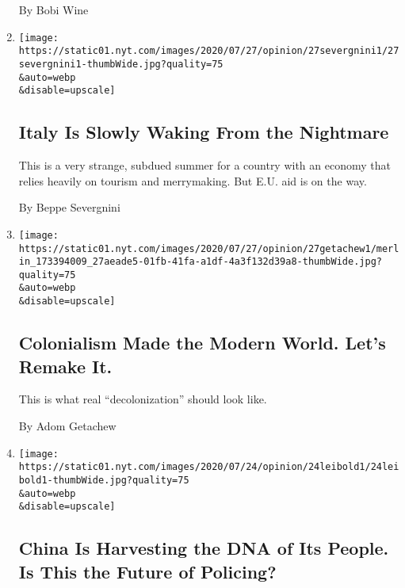 \begin{enumerate}
  By Bobi Wine
\item
  \href{/2020/07/27/opinion/italy-coronavirus.html}{}

  \texttt{[image: https://static01.nyt.com/images/2020/07/27/opinion/27severgnini1/27severgnini1-thumbWide.jpg?quality=75\\\&auto=webp\\\&disable=upscale]}

  \hypertarget{italy-is-slowly-waking-from-the-nightmare}{%
  \subsection{Italy Is Slowly Waking From the
  Nightmare}\label{italy-is-slowly-waking-from-the-nightmare}}

  This is a very strange, subdued summer for a country with an economy
  that relies heavily on tourism and merrymaking. But E.U. aid is on the
  way.

  By Beppe Severgnini
\item
  \href{/2020/07/27/opinion/sunday/decolonization-statues.html}{}

  \texttt{[image: https://static01.nyt.com/images/2020/07/27/opinion/27getachew1/merlin\_173394009\_27aeade5-01fb-41fa-a1df-4a3f132d39a8-thumbWide.jpg?quality=75\\\&auto=webp\\\&disable=upscale]}

  \hypertarget{colonialism-made-the-modern-world-lets-remake-it}{%
  \subsection{Colonialism Made the Modern World. Let's Remake
  It.}\label{colonialism-made-the-modern-world-lets-remake-it}}

  This is what real ``decolonization'' should look like.

  By Adom Getachew
\item
  \href{/2020/07/24/opinion/china-dna-police.html}{}

  \texttt{[image: https://static01.nyt.com/images/2020/07/24/opinion/24leibold1/24leibold1-thumbWide.jpg?quality=75\\\&auto=webp\\\&disable=upscale]}

  \hypertarget{china-is-harvesting-the-dna-of-its-people-is-this-the-future-of-policing}{%
  \subsection{China Is Harvesting the DNA of Its People. Is This the
  Future of
  Policing?}\label{china-is-harvesting-the-dna-of-its-people-is-this-the-future-of-policing}}


\end{enumerate}
